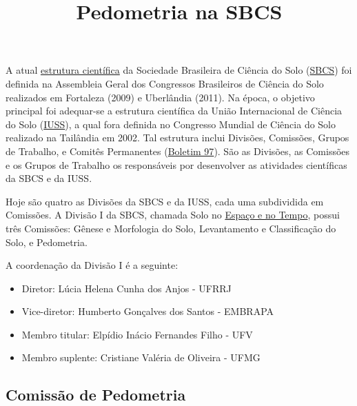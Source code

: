 \title{Pedometria na SBCS}
\maketitle
\newcommand{\estrutura}{\href{http://www.sbcs.org.br/a-sbcs/estatuto/}{estrutura científica}}
\newcommand{\SBCS}{\href{http://www.sbcs.org.br/}{SBCS}}
\newcommand{\IUSS}{\href{http://www.iuss.org/}{IUSS}}
\newcommand{\boletim}{\href{http://www.iuss.org/images/stories/IUSS\%20Bulletin\%201\%20-\%20117/00000097.pdf}{Boletim 97}}
\newcommand{\EspacoTempo}{\href{http://www.sbcs.org.br/comissoes-especializadas/divisao-1-solo-no-espaco-e-no-tempo/}{Espaço e no Tempo}}
\newcommand{\PedometronOnze}{\href{http://www.pedometrics.org/Pedometron/pedometron11.pdf}{Pedometron 11}}
\newcommand{\PedometronDoze}{\href{http://www.pedometrics.org/Pedometron/pedometron12.pdf}{Pedometron 12}}

A atual \estrutura{} da Sociedade Brasileira de Ciência do Solo (\SBCS) foi definida na Assembleia Geral dos Congressos Brasileiros de Ciência do Solo realizados em Fortaleza (2009) e Uberlândia (2011). Na época, o objetivo principal foi adequar-se a estrutura científica da União Internacional de Ciência do Solo (\IUSS), a qual fora definida no Congresso Mundial de Ciência do Solo realizado na Tailândia em 2002. Tal estrutura inclui Divisões, Comissões, Grupos de Trabalho, e Comitês Permanentes (\boletim). São as Divisões, as Comissões e os Grupos de Trabalho os responsáveis por desenvolver as atividades científicas da SBCS e da IUSS.

Hoje são quatro as Divisões da SBCS e da IUSS, cada uma subdividida em Comissões. A Divisão I da SBCS, chamada Solo no \EspacoTempo, possui três Comissões: Gênese e Morfologia do Solo, Levantamento e Classificação do Solo, e Pedometria.

A coordenação da Divisão I é a seguinte:

\begin{itemize}
 \item Diretor: Lúcia Helena Cunha dos Anjos - UFRRJ
 \item Vice-diretor: Humberto Gonçalves dos Santos - EMBRAPA
 \item Membro titular: Elpídio Inácio Fernandes Filho - UFV
 \item Membro suplente: Cristiane Valéria de Oliveira - UFMG
\end{itemize}

\subsection{Comissão de Pedometria}

